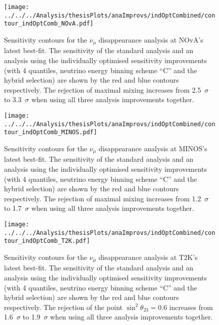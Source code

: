 \begin{figure}
  \centering
\texttt{[image: ../../../Analysis/thesisPlots/anaImprovs/indOptCombined/contour\_indOptComb\_NOvA.pdf]}
  \caption{
    Sensitivity contours for the $\nu_\mu$ disappearance analysis at
    NOvA's latest best-fit. 
    The sensitivity of the standard analysis and an analysis using the
    individually optimised sensitivity improvements (with 4
    \hadefrac{} quantiles, neutrino energy binning scheme ``C'' and
    the hybrid selection) are shown by the red and blue contours
    respectively.  
    The rejection of maximal mixing
    increases from 2.5~$\sigma$ to 3.3~$\sigma$ when using all three
    analysis improvements together. 
  } 
  \label{fig:contour_indOptComb_NOvA}
\end{figure}

\begin{figure}
  \centering
\texttt{[image: ../../../Analysis/thesisPlots/anaImprovs/indOptCombined/contour\_indOptComb\_MINOS.pdf]}
  \caption{
    Sensitivity contours for the $\nu_\mu$ disappearance analysis at
    MINOS's latest best-fit. 
    The sensitivity of the standard analysis and an analysis using the
    individually optimised sensitivity improvements (with 4
    \hadefrac{} quantiles, neutrino energy binning scheme ``C'' and
    the hybrid selection) are shown by the red and blue contours
    respectively.  
    The rejection of maximal mixing
    increases from 1.2~$\sigma$ to 1.7~$\sigma$ when using all three
    analysis improvements together. 
  } 
  \label{fig:contour_indOptComb_MINOS}
\end{figure}

\begin{figure}
  \centering
\texttt{[image: ../../../Analysis/thesisPlots/anaImprovs/indOptCombined/contour\_indOptComb\_T2K.pdf]}
  \caption{
    Sensitivity contours for the $\nu_\mu$ disappearance analysis at
    T2K's latest best-fit. 
    The sensitivity of the standard analysis and an analysis using the
    individually optimised sensitivity improvements (with 4
    \hadefrac{} quantiles, neutrino energy binning scheme ``C'' and
    the hybrid selection) are shown by the red and blue contours
    respectively.  
    The rejection of the point $\sin^2\theta_{23} = 0.6$ increases
    from 1.6~$\sigma$ to 1.9~$\sigma$ when using all three analysis
    improvements together.  
  } 
  \label{fig:contour_indOptComb_T2K}
\end{figure}


